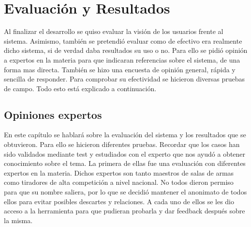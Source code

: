 \chapter{Evaluación y Resultados}
\label{cap:Evaluación y resultados}

Al finalizar el desarrollo se quiso evaluar la visión de los usuarios frente al sistema.
Asimismo, también se pretendió evaluar como de efectivo era realmente dicho sistema,
si de verdad daba resultados su uso o no. Para ello se pidió opinión a expertos en la materia
para que indicaran referencias sobre el sistema, de una forma mas directa. También se hizo
una encuesta de opinión general, rápida y sencilla de responder. Para comprobar su efectividad
se hicieron diversas pruebas de campo. Todo esto está explicado a continuación.


\section{Opiniones expertos}

En este capítulo se hablará sobre la evaluación del sistema y los resultados que se obtuvieron.
Para ello se hicieron diferentes pruebas. Recordar que los casos han sido validados mediante
test y estudiados con el experto que nos ayudó a obtener conocimiento sobre el tema.
La primera de ellas fue una evaluación con diferentes
expertos en la materia. Dichos expertos son tanto maestros de salas de armas como tiradores
de alta competición a nivel nacional. No todos dieron permiso para que su nombre saliera, por
lo que se decidió mantener el anonimato de todos ellos para evitar posibles descartes y relaciones.
A cada uno de ellos se les dio acceso a la herramienta para que pudieran probarla y dar feedback
después sobre la misma.

